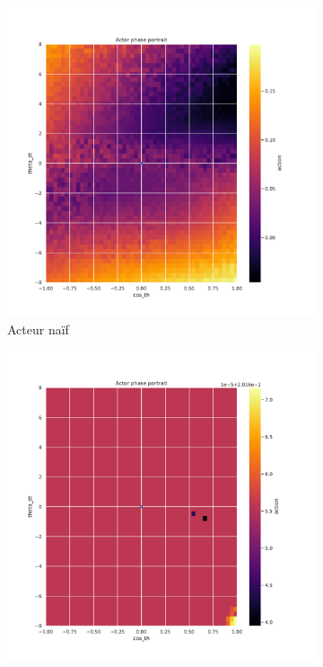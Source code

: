 \begin{figure}[H]
    \centering
    \begin{subfigure}{0.3\textwidth}
        \includegraphics[width=\textwidth]{figures/iteration2/0_actor_discount__ante_Pendulum-v0.pdf}
        \caption{Acteur naïf}
    \end{subfigure}
    \begin{subfigure}{0.3\textwidth}
        \includegraphics[width=\textwidth]{figures/iteration2/0_actor_discount__post_Pendulum-v0.pdf}

\end{subfigure}
\end{figure}
